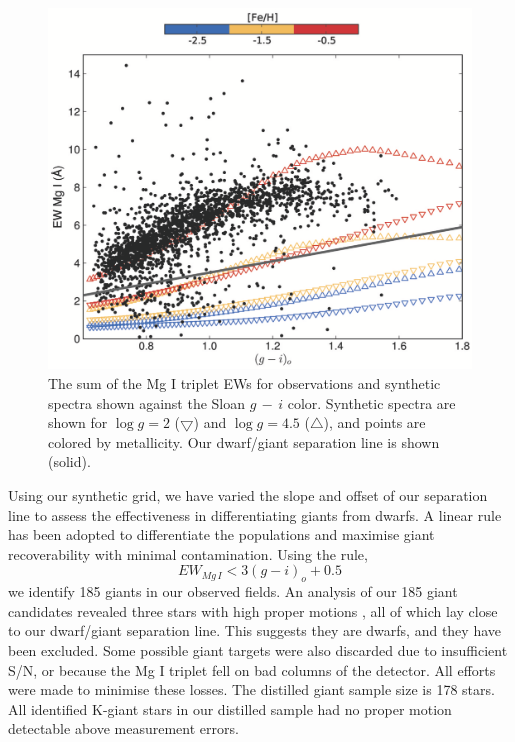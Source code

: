 \documentclass[preprint2]{aastex}
\begin{document}
\begin{figure}[h]
	\includegraphics[width=\columnwidth]{./dwarfgiant.eps}
	\caption{The sum of the Mg I triplet EWs for observations and synthetic spectra shown against the Sloan $g\,-\,i$ color. Synthetic spectra are shown for $\log{g} = 2$ ($\bigtriangledown$) and $\log{g} = 4.5$ ($\bigtriangleup$), and points are colored by metallicity. Our dwarf/giant separation line is shown (solid). }
	\label{fig:dwarf-giant-separation}
\end{figure}

 Using our synthetic grid, we have varied the slope and offset of our separation line to assess the effectiveness in differentiating giants from dwarfs.  A linear rule has been adopted to differentiate the populations and maximise giant recoverability with minimal contamination. Using the rule,
\begin{equation}
	EW_{Mg\,I} < 3(g-i)_o + 0.5
\end{equation}
\noindent we identify 185 giants in our observed fields. An analysis of our 185 giant candidates revealed three stars with high proper motions \citep[PPMXL Catalog][]{Roser;et-al_2010}, all of which lay close to our dwarf/giant separation line. This suggests they are dwarfs, and they have been excluded. Some possible giant targets were also discarded due to insufficient S/N, or because the Mg I triplet fell on bad columns of the detector. All efforts were made to minimise these losses. The distilled giant sample size is 178 stars.  All identified K-giant stars in our distilled sample had no proper motion detectable above measurement errors.
\end{document}
